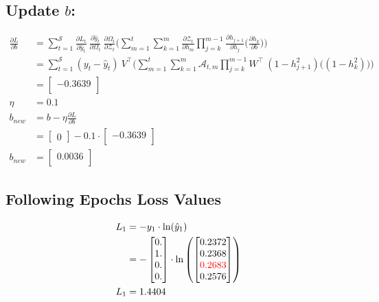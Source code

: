 \documentclass{article}
\begin{document}
\subsection{Update $b$:}
\begin{align*}
     \frac{\partial L}{ \partial{b}} &=
\sum_{t=1}^{\mathcal{S}}
\frac{\partial L_t}{\partial \hat{y}_t}~\frac{\partial \hat{y}_t}{\partial \Omega_t}~\frac{\partial \Omega_t}{ \partial \mathcal{Z}_t} \biggl( 
\sum_{m=1}^{t}
\sum_{k=1}^{m} \frac{\partial \mathcal{Z}_t}{ \partial h_m} 
\prod_{j=k}^{m-1} \frac{\partial h_{j+1}}{ \partial h_j} 
\biggl( \frac{\partial h_k}{ \partial b} \biggl) \biggl)\\
  &=
\sum_{t=1}^{\mathcal{S}}
(y_t - \hat{y}_t)~V^\top \biggl( 
\sum_{m=1}^{t}
\sum_{k=1}^{m} \mathcal{A}_{t,m} 
\prod_{j=k}^{m-1} W^\top ~ (1 - h_{j+1}^2)
\biggl( (1-h_k^2) \biggl) \biggl) \\
 &=\begin{bmatrix}
-0.3639 \\
\end{bmatrix} \\
\eta &= 0.1\\
b_{new} &= b - \eta \frac{\partial L}{\partial b}\\
 &= \begin{bmatrix}
0
\end{bmatrix}- 0.1 \cdot \begin{bmatrix}
-0.3639 \\
\end{bmatrix} \\
b_{new} &= \begin{bmatrix}
0.0036 \\
\end{bmatrix}
\end{align*}
\subsection{Following Epochs Loss Values}

\begin{align*}
    L_1 &= -y_1 \cdot \ln(\hat{y}_1) \\
    &= -\begin{bmatrix} 0. \\ 1. \\ 0. \\ 0. \end{bmatrix} \cdot \ln\left(\begin{bmatrix}
0.2372 \\
0.2368 \\
\textcolor{red}{0.2683} \\
0.2576 \\
\end{bmatrix}\right) \\
    L_1 &= 1.4404
\end{align*}
\end{document}
